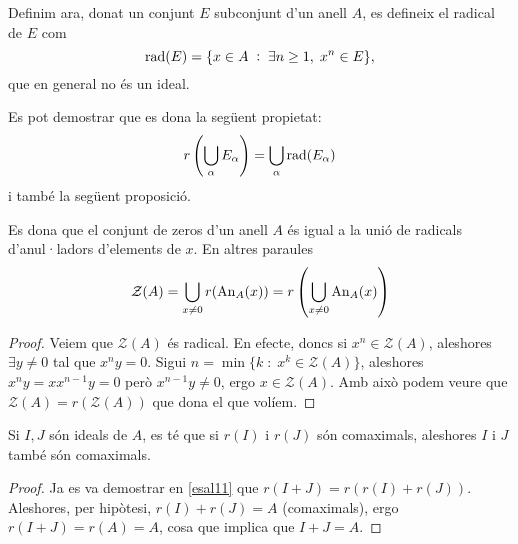 \documentclass[../../../main.tex]{subfiles}
\begin{document}
\begin{defi}
Definim ara, donat un conjunt $E$ subconjunt d'un anell $A$, es defineix el radical de $E$ com
\begin{equation}
    \notag
    \operatorname{\mathrm{rad}}(E) = \{x\in A\;:\;\exists n\geq 1,\;x^n\in E\},
\end{equation}
que en general no és un ideal.
\end{defi}

Es pot demostrar que es dona la següent propietat:
\begin{equation}
    \notag
    r\left(\bigcup_\alpha E_\alpha\right) = \bigcup_\alpha \operatorname{\mathrm{rad}}(E_\alpha)
\end{equation}
i també la següent proposició.

\begin{prop}
\label{prop:elementradical} Es dona que el conjunt de zeros d'un anell $A$ és igual a la unió de radicals d'anul·ladors d'elements de $x$. En altres paraules
\begin{equation}
    \notag
    \mathcal{Z}(A) = \bigcup_{x\neq0}r(\mathrm{An}_A(x)) = r\left(\bigcup_{x\neq 0}\mathrm{An}_A(x)\right)
\end{equation}
\end{prop}
\begin{proof}
Veiem que $\mathcal{Z}(A)$ és radical. En efecte, doncs si $x^n\in \mathcal{Z}(A)$, aleshores $\exists y\not=0$ tal que $x^ny = 0$. Sigui $n = \min\{k\;:\;x^k\in\mathcal{Z}(A)\}$, aleshores $x^ny = xx^{n-1}y = 0$ però $x^{n-1}y\not=0$, ergo $x\in\mathcal{Z}(A)$. Amb això podem veure que $\mathcal{Z}(A) = r(\mathcal{Z}(A))$ que dona el que volíem.
\end{proof}

\begin{prop}
Si $I,J$ són ideals de $A$, es té que si $r(I)$ i $r(J)$ són comaximals, aleshores $I$ i $J$ també són comaximals.
\end{prop}
\begin{proof}
Ja es va demostrar en \ref{esal11} que $r(I+J) = r(r(I)+r(J))$. Aleshores, per hipòtesi, $r(I)+r(J) = A$ (comaximals), ergo $r(I+J) = r(A) = A$, cosa que implica que $I+J = A$. 
\end{proof}
\end{document}
